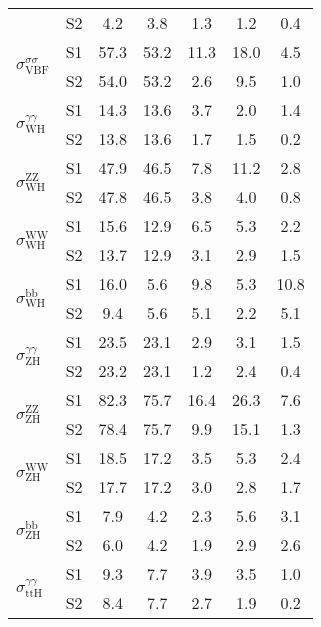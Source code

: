 \begin{tabular}{@{} l c c@{\hskip 0.15in} c c c c @{}}
                        & S2  & 4.2& 3.8 & 1.3 & 1.2 & 0.4  \\[4pt]
\multirow{2}{*}{$\sigma_{\mathrm{VBF}}^{\sigma \sigma }$} & S1  & 57.3& 53.2 & 11.3 & 18.0 & 4.5  \\[1pt]
                        & S2  & 54.0& 53.2 & 2.6 & 9.5 & 1.0  \\[4pt]
\multirow{2}{*}{$\sigma_{\mathrm{WH}}^{\gamma \gamma }$} & S1  & 14.3& 13.6 & 3.7 & 2.0 & 1.4  \\[1pt]
                        & S2  & 13.8& 13.6 & 1.7 & 1.5 & 0.2  \\[4pt]
\multirow{2}{*}{$\sigma_{\mathrm{WH}}^{\mathrm{ZZ}}$} & S1  & 47.9& 46.5 & 7.8 & 11.2 & 2.8  \\[1pt]
                        & S2  & 47.8& 46.5 & 3.8 & 4.0 & 0.8  \\[4pt]
\multirow{2}{*}{$\sigma_{\mathrm{WH}}^{\mathrm{WW}}$} & S1  & 15.6& 12.9 & 6.5 & 5.3 & 2.2  \\[1pt]
                        & S2  & 13.7& 12.9 & 3.1 & 2.9 & 1.5  \\[4pt]
\multirow{2}{*}{$\sigma_{\mathrm{WH}}^{\mathrm{bb}}$} & S1  & 16.0& 5.6 & 9.8 & 5.3 & 10.8  \\[1pt]
                        & S2  & 9.4& 5.6 & 5.1 & 2.2 & 5.1  \\[4pt]
\multirow{2}{*}{$\sigma_{\mathrm{ZH}}^{\gamma \gamma }$} & S1  & 23.5& 23.1 & 2.9 & 3.1 & 1.5  \\[1pt]
                        & S2  & 23.2& 23.1 & 1.2 & 2.4 & 0.4  \\[4pt]
\multirow{2}{*}{$\sigma_{\mathrm{ZH}}^{\mathrm{ZZ}}$} & S1  & 82.3& 75.7 & 16.4 & 26.3 & 7.6  \\[1pt]
                        & S2  & 78.4& 75.7 & 9.9 & 15.1 & 1.3  \\[4pt]
\multirow{2}{*}{$\sigma_{\mathrm{ZH}}^{\mathrm{WW}}$} & S1  & 18.5& 17.2 & 3.5 & 5.3 & 2.4  \\[1pt]
                        & S2  & 17.7& 17.2 & 3.0 & 2.8 & 1.7  \\[4pt]
\multirow{2}{*}{$\sigma_{\mathrm{ZH}}^{\mathrm{bb}}$} & S1  & 7.9& 4.2 & 2.3 & 5.6 & 3.1  \\[1pt]
                        & S2  & 6.0& 4.2 & 1.9 & 2.9 & 2.6  \\[4pt]
\multirow{2}{*}{$\sigma_{\mathrm{ttH}}^{\gamma \gamma }$} & S1  & 9.3& 7.7 & 3.9 & 3.5 & 1.0  \\[1pt]
                        & S2  & 8.4& 7.7 & 2.7 & 1.9 & 0.2  \\[4pt]

\end{tabular}
